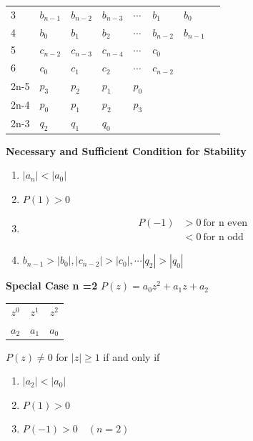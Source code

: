 \begin{multicols}{2}
\begin{minipage}[t]{1\linewidth}
\begin{minipage}[h]{0.75\linewidth}
\begin{tabular}{llllllll}
3   & $b_{n-1}$ & $b_{n-2}$ & $b_{n-3}$ & $\cdots$ & $b_1$     & $b_0$     &       \\ %
4   & $b_0$     & $b_1$     & $b_2$     & $\cdots$ & $b_{n-2}$ & $b_{n-1}$ &       \\
5   & $c_{n-2}$ & $c_{n-3}$ & $c_{n-4}$ & $\cdots$ & $c_0$     &           &       \\
6   & $c_0$     & $c_1$     & $c_2$     & $\cdots$ & $c_{n-2}$ &           &      \\
2n-5& $p_3$ & $p_2$ & $p_1$ & $p_0$ & & \\
2n-4& $p_0$ & $p_1$ & $p_2$ & $p_3$ & & \\
2n-3& $q_2$ & $q_1$ & $q_0$ & & & 
\end{tabular}
\end{minipage}
\end{minipage}

\textbf{Necessary and Sufficient Condition for Stability} \newline
\begin{minipage}[h]{0.55\linewidth}
\begin{enumerate}
\item $|a_n| < |a_0|$ 
\item $P(1) > 0$
\item \begin{align*}
P(-1) & > 0 \ \text{for n even } \\
& < 0 \ \text{for n odd}
\end{align*}
\item $b_{n-1}> |b_0|, |c_{n-2}|>|c_0|, \cdots |q_2| > |q_0|$
\end{enumerate}
\end{minipage}
\begin{minipage}[h]{0.5\linewidth}
\textbf{Special Case n =2} \newline 
$P(z) =a_0z^2+a_1z+a_2$ \newline 
\begin{tabular}{c c c}
$z^0$ & $z^1$& $z^2$ \\
$a_2$ & $a_1$ & $a_0$
\end{tabular} \newline
$P(z) \neq 0$ for $|z| \geq 1$ if and only if 
\begin{enumerate}
\item $|a_2| < |a_0|$
\item $P(1) > 0$
\item $P(-1) > 0 \quad (n=2)$
\end{enumerate}
\end{minipage}


\end{multicols}

